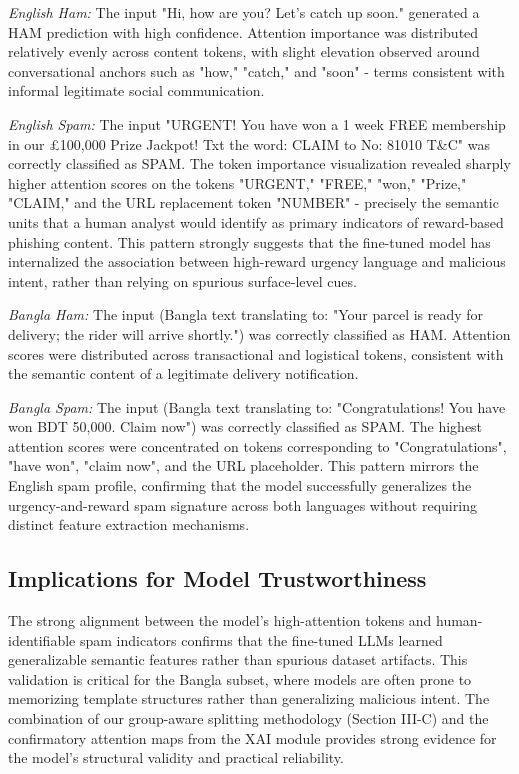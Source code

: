\documentclass[journal]{IEEEtran}
\begin{document}
\textit{English Ham:} The input "Hi, how are you? Let's catch up soon."
generated a HAM prediction with high confidence. Attention importance
was distributed relatively evenly across content tokens, with slight
elevation observed around conversational anchors such as "how," "catch,"
and "soon" - terms consistent with informal legitimate social
communication.

\textit{English Spam:} The input "URGENT! You have won a 1 week FREE
membership in our \pounds 100,000 Prize Jackpot! Txt the word: CLAIM to No:
81010 T\&C" was correctly classified as SPAM. The token importance
visualization revealed sharply higher attention scores on the tokens
"URGENT," "FREE," "won," "Prize," "CLAIM," and the URL replacement token
"NUMBER" - precisely the semantic units that a human analyst would
identify as primary indicators of reward-based phishing content. This
pattern strongly suggests that the fine-tuned model has internalized the
association between high-reward urgency language and malicious intent,
rather than relying on spurious surface-level cues.

\textit{Bangla Ham:} The input (Bangla text translating to: "Your parcel is ready for delivery; the rider will arrive shortly.") was correctly classified as HAM. Attention scores were distributed across transactional and logistical tokens, consistent with the semantic content of a legitimate delivery notification.

\textit{Bangla Spam:} The input (Bangla text translating to: "Congratulations! You have won BDT 50,000. Claim now") was correctly classified as SPAM. The highest attention scores were concentrated on tokens corresponding to "Congratulations", "have won", "claim now", and the URL placeholder. This pattern mirrors the English spam profile, confirming that the model successfully generalizes the urgency-and-reward spam signature across both languages without requiring distinct feature extraction mechanisms.


\subsection{Implications for Model Trustworthiness}

The strong alignment between the model's high-attention tokens and human-identifiable spam indicators confirms that the fine-tuned LLMs learned generalizable semantic features rather than spurious dataset artifacts. This validation is critical for the Bangla subset, where models are often prone to memorizing template structures rather than generalizing malicious intent. The combination of our group-aware splitting methodology (Section III-C) and the confirmatory attention maps from the XAI module provides strong evidence for the model's structural validity and practical reliability.
\end{document}
